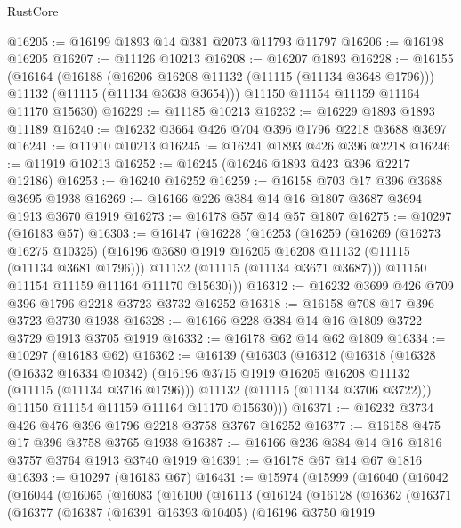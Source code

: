 \begin{lexlean}{RustCore}
\begin{coremodule}
@16205 := @16199 @1893 @14 @381 @2073 @11793 @11797
@16206 := @16198 @16205
@16207 := @11126 @10213
@16208 := @16207 @1893
@16228 := @16155
    (@16164
      (@16188
        (@16206 @16208 @11132 (@11115 (@11134 @3648 @1796)))
        @11132
        (@11115 (@11134 @3638 @3654)))
      @11150
      @11154
      @11159
      @11164
      @11170
      @15630)
@16229 := @11185 @10213
@16232 := @16229 @1893 @1893 @11189
@16240 := @16232 @3664 @426 @704 @396 @1796 @2218 @3688 @3697
@16241 := @11910 @10213
@16245 := @16241 @1893 @426 @396 @2218
@16246 := @11919 @10213
@16252 := @16245 (@16246 @1893 @423 @396 @2217 @12186)
@16253 := @16240 @16252
@16259 := @16158 @703 @17 @396 @3688 @3695 @1938
@16269 := @16166 @226 @384 @14 @16 @1807 @3687 @3694 @1913 @3670 @1919
@16273 := @16178 @57 @14 @57 @1807
@16275 := @10297 (@16183 @57)
@16303 := @16147
    (@16228
      (@16253
        (@16259
          (@16269
            (@16273 @16275 @10325)
            (@16196 @3680 @1919 @16205 @16208 @11132 (@11115 (@11134 @3681 @1796)))
            @11132
            (@11115 (@11134 @3671 @3687)))
          @11150
          @11154
          @11159
          @11164
          @11170
          @15630)))
@16312 := @16232 @3699 @426 @709 @396 @1796 @2218 @3723 @3732 @16252
@16318 := @16158 @708 @17 @396 @3723 @3730 @1938
@16328 := @16166 @228 @384 @14 @16 @1809 @3722 @3729 @1913 @3705 @1919
@16332 := @16178 @62 @14 @62 @1809
@16334 := @10297 (@16183 @62)
@16362 := @16139
    (@16303
      (@16312
        (@16318
          (@16328
            (@16332 @16334 @10342)
            (@16196 @3715 @1919 @16205 @16208 @11132 (@11115 (@11134 @3716 @1796)))
            @11132
            (@11115 (@11134 @3706 @3722)))
          @11150
          @11154
          @11159
          @11164
          @11170
          @15630)))
@16371 := @16232 @3734 @426 @476 @396 @1796 @2218 @3758 @3767 @16252
@16377 := @16158 @475 @17 @396 @3758 @3765 @1938
@16387 := @16166 @236 @384 @14 @16 @1816 @3757 @3764 @1913 @3740 @1919
@16391 := @16178 @67 @14 @67 @1816
@16393 := @10297 (@16183 @67)
@16431 := @15974
    (@15999
      (@16040
        (@16042
          (@16044
            (@16065
              (@16083
                (@16100
                  (@16113
                    (@16124
                      (@16128
                        (@16362
                          (@16371
                            (@16377
                              (@16387
                                (@16391 @16393 @10405)
                                (@16196
                                  @3750
                                  @1919

\end{coremodule}
\end{lexlean}
